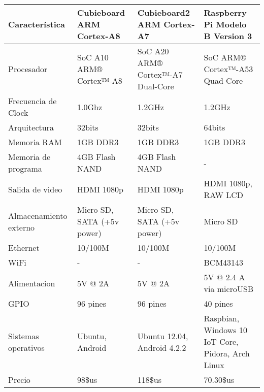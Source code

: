 \begin{tabular}{|C{3cm}|C{3.5cm}|C{3.5cm}|C{3.5cm}|}
  \hline
  Característica & Cubieboard ARM Cortex-A8 & Cubieboard2 ARM Cortex-A7 & Raspberry Pi Modelo B Version 3\\
  \hline
  Procesador & SoC A10 ARM® Cortex™-A8 & SoC A20 ARM® Cortex™-A7 Dual-Core & SoC ARM® Cortex™-A53 Quad Core \\
  \hline
  Frecuencia de Clock & 1.0Ghz & 1.2GHz & 1.2GHz \\
  \hline
  Arquitectura & 32bits & 32bits & 64bits \\
  \hline
  Memoria RAM & 1GB DDR3 & 1GB DDR3 & 1GB DDR3 \\
  \hline
  Memoria de programa & 4GB Flash NAND & 4GB Flash NAND & - \\
  \hline
  Salida de video & HDMI 1080p & HDMI 1080p & HDMI 1080p, RAW LCD \\
  \hline
  Almacenamiento externo & Micro SD, SATA (+5v power) & Micro SD, SATA (+5v power) & Micro SD \\
  \hline
  Ethernet & 10/100M & 10/100M & 10/100M \\
  \hline
  WiFi & - & - & BCM43143 \\
  \hline
  Alimentacion & 5V @ 2A & 5V @ 2A & 5V @ 2.4 A via microUSB \\
  \hline
  GPIO & 96 pines & 96 pines & 40 pines \\
  \hline
  Sistemas operativos & Ubuntu, Android & Ubuntu 12.04, Android 4.2.2 & Raspbian, Windows 10 IoT Core, Pidora, Arch Linux \\
  \hline
  Precio & 98\$us & 118\$us & 70.30\$us \\
  \hline
\end{tabular}
